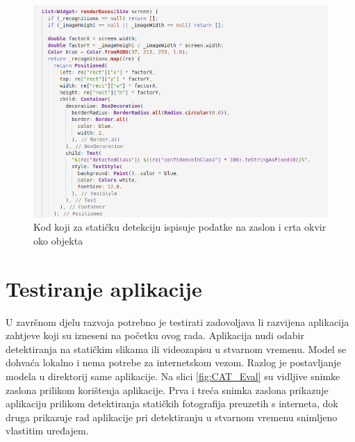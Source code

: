 \begin{figure}[htb]
    \centering
    \includegraphics[width=14cm]{img/Flutter-render-boxes.png}
    \caption{Kod koji za statičku detekciju ispisuje podatke na zaslon i crta okvir oko objekta}
    \label{Flutter-render-boxes}
\end{figure}

\section{Testiranje aplikacije}
U završnom djelu razvoja potrebno je testirati zadovoljava li razvijena aplikacija zahtjeve koji su izneseni na početku ovog rada. Aplikacija nudi odabir 
detektiranja na statičkim slikama ili videozapisu u stvarnom vremenu. Model se dohvaća lokalno i nema potrebe za internetskom vezom. Razlog je postavljanje modela 
u direktorij same aplikacije.
Na slici \ref{fig:CAT_Eval} su vidljive snimke zaslona prilikom korištenja aplikacije. 
Prva i treća snimka zaslona prikazuje aplikaciju prilikom detektiranja statičkih fotografija preuzetih s interneta, dok druga prikazuje rad aplikacije pri detektiranju u stvarnom vremenu snimljeno vlastitim uređajem.


